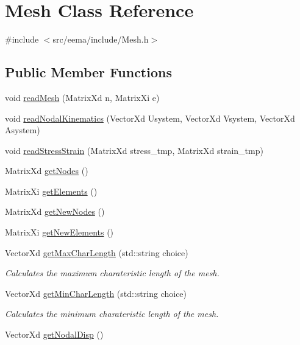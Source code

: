\hypertarget{class_mesh}{}\section{Mesh Class Reference}
\label{class_mesh}


{\ttfamily \#include $<$src/eema/include/\+Mesh.\+h$>$}

\subsection*{Public Member Functions}
\begin{DoxyCompactItemize}
\item 
void \hyperlink{class_mesh_aba57df50d740f660cadf00aefe75e157}{read\+Mesh} (Matrix\+Xd n, Matrix\+Xi e)
\item 
void \hyperlink{class_mesh_a2193a797388525febbac794d17bea23e}{read\+Nodal\+Kinematics} (Vector\+Xd Usystem, Vector\+Xd Vsystem, Vector\+Xd Asystem)
\item 
void \hyperlink{class_mesh_a2c1456f1b3b5bda8d213624e3943dbb3}{read\+Stress\+Strain} (Matrix\+Xd stress\+\_\+tmp, Matrix\+Xd strain\+\_\+tmp)
\item 
Matrix\+Xd \hyperlink{class_mesh_a0b0f7458f07745240d9bda967cda12de}{get\+Nodes} ()
\item 
Matrix\+Xi \hyperlink{class_mesh_a4828631f942fd5a701870beea870f413}{get\+Elements} ()
\item 
Matrix\+Xd \hyperlink{class_mesh_a52ecce406bbef80cbf3610db3ea5ea40}{get\+New\+Nodes} ()
\item 
Matrix\+Xi \hyperlink{class_mesh_a6e425e9499e64ab52c4555aa3763651d}{get\+New\+Elements} ()
\item 
Vector\+Xd \hyperlink{class_mesh_a72d2a3863b85a2a2aed7deca8ce37832}{get\+Max\+Char\+Length} (std\+::string choice)
\begin{DoxyCompactList}\small\item\em Calculates the maximum charateristic length of the mesh. \end{DoxyCompactList}\item 
Vector\+Xd \hyperlink{class_mesh_a94ce58cb2598b1db2973ad357dae2710}{get\+Min\+Char\+Length} (std\+::string choice)
\begin{DoxyCompactList}\small\item\em Calculates the minimum charateristic length of the mesh. \end{DoxyCompactList}\item 
Vector\+Xd \hyperlink{class_mesh_a3fbc4b3c21f738efc6cdf3d02e31ad23}{get\+Nodal\+Disp} ()

\end{DoxyCompactItemize}
